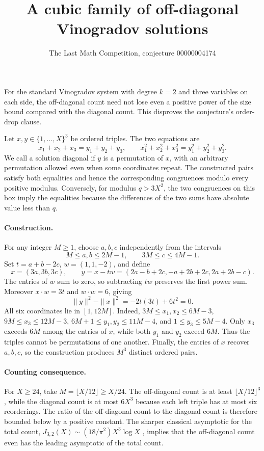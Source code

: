 \documentclass[11pt]{article}
\title{A cubic family of off-diagonal Vinogradov solutions}
\author{The Last Math Competition, conjecture 00000004174}
\date{}
\begin{document}
\maketitle

For the standard Vinogradov system with degree \(k=2\) and three variables
on each side, the off-diagonal count need not lose even a positive power
of the size bound compared with the diagonal count. This disproves the
conjecture's order-drop clause.

Let \(x,y\in\{1,\ldots,X\}^{3}\) be ordered triples. The two equations are
\[
 x_1+x_2+x_3=y_1+y_2+y_3,
 \qquad x_1^2+x_2^2+x_3^2=y_1^2+y_2^2+y_3^2.
\]
We call a solution diagonal if \(y\) is a permutation of \(x\), with an
arbitrary permutation allowed even when some coordinates repeat. The
constructed pairs satisfy both equalities and hence the corresponding
congruences modulo every positive modulus. Conversely, for modulus
\(q>3X^2\), the two congruences on this box imply the equalities because
the differences of the two sums have absolute value less than \(q\).

\paragraph{Construction.}
For any integer \(M\ge 1\), choose \(a,b,c\) independently from the intervals
\[
 M\le a,b\le 2M-1,\qquad 3M\le c\le 4M-1.
\]
Set \(t=a+b-2c\), \(w=(1,1,-2)\), and define
\[
 x=(3a,3b,3c),\qquad
 y=x-tw=(2a-b+2c,-a+2b+2c,2a+2b-c).
\]
The entries of \(w\) sum to zero, so subtracting \(tw\) preserves the first
power sum. Moreover \(x\cdot w=3t\) and \(w\cdot w=6\), giving
\[
 \|y\|^2-\|x\|^2=-2t(3t)+6t^2=0.
\]
All six coordinates lie in \([1,12M]\). Indeed,
\(3M\le x_1,x_2\le 6M-3\), \(9M\le x_3\le 12M-3\),
\(6M+1\le y_1,y_2\le 11M-4\), and \(1\le y_3\le 5M-4\).
Only \(x_3\) exceeds \(6M\) among the entries of \(x\), while both \(y_1\)
and \(y_2\) exceed \(6M\). Thus the triples cannot be permutations of one
another. Finally, the entries of \(x\) recover \(a,b,c\), so the construction
produces \(M^3\) distinct ordered pairs.

\paragraph{Counting consequence.}
For \(X\ge 24\), take \(M=\lfloor X/12\rfloor\ge X/24\). The off-diagonal
count is at least \(\lfloor X/12\rfloor^3\), while the diagonal count is at
most \(6X^3\) because each left triple has at most six reorderings. The
ratio of the off-diagonal count to the diagonal count is therefore bounded
below by a positive constant. The sharper classical asymptotic for the total
count, \(J_{3,2}(X)\sim (18/\pi^2)X^3\log X\) \cite{bb}, implies that the
off-diagonal count even has the leading asymptotic of the total count.
\end{document}
